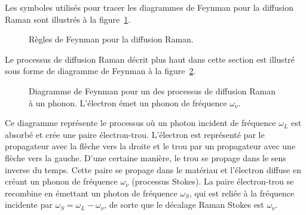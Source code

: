 Les symboles utilisés pour tracer les diagrammes de Feynman pour la diffusion Raman sont illustrés à la figure~\ref{fig:règles_Raman}.
\begin{figure}[htbp]
    \centering
    
    \caption[Règles de Feynman pour la diffusion Raman.]{Règles de Feynman pour la diffusion Raman.}
    \label{fig:règles_Raman}
\end{figure}

\noindent Le processus de diffusion Raman décrit plus haut dans cette section est illustré sous forme de diagramme de Feynman à la figure~\ref{fig:e1}.
\begin{figure}[htbp]
    \centering
    
    \caption[Diagramme de Feynman pour un des processus de diffusion Raman à un phonon.]{Diagramme de Feynman pour un des processus de diffusion Raman à un phonon. L'électron émet un phonon de fréquence $\omega_\nu$.}
    \label{fig:e1}
\end{figure}
Ce diagramme représente le processus où un photon incident de fréquence $\omega_L$ est absorbé et crée une paire électron-trou. L'électron est représenté par le propagateur avec la flèche vers la droite et le trou par un propagateur avec une flèche vers la gauche. D'une certaine manière, le trou se propage dans le sens inverse du temps. Cette paire se propage dans le matériau et l'électron diffuse en créant un phonon de fréquence $\omega_\nu$ (processus Stokes). La paire électron-trou se recombine en émettant un photon de fréquence $\omega_S$, qui est reliée à la fréquence incidente par $\omega_S = \omega_L - \omega_\nu$, de sorte que le décalage Raman Stokes est $\omega_\nu$.


